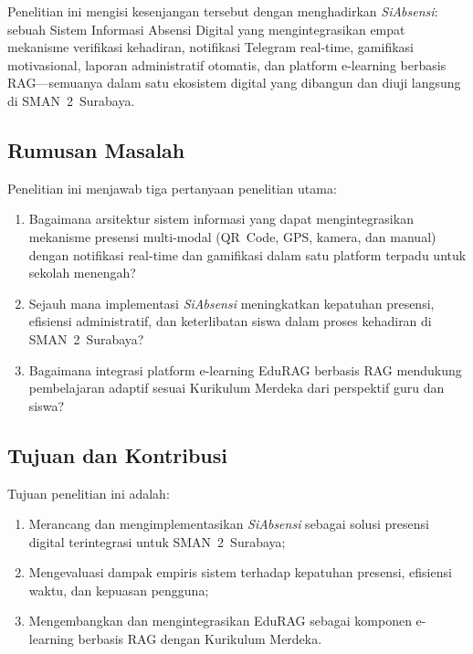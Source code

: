 \documentclass[12pt,a4paper]{article}
\newcommand{\sman}{SMAN~2~Surabaya}
\newcommand{\edurag}{EduRAG}
\newcommand{\sistem}{\textit{SiAbsensi}}
\begin{document}
Penelitian ini mengisi kesenjangan tersebut dengan menghadirkan
\sistem{}: sebuah Sistem Informasi Absensi Digital yang mengintegrasikan
empat mekanisme verifikasi kehadiran, notifikasi Telegram real-time,
gamifikasi motivasional, laporan administratif otomatis, dan platform
e-learning berbasis RAG---semuanya dalam satu ekosistem digital yang
dibangun dan diuji langsung di \sman{}.

\subsection{Rumusan Masalah}

Penelitian ini menjawab tiga pertanyaan penelitian utama:
\begin{enumerate}[label=\textbf{RQ\arabic*.}]
  \item Bagaimana arsitektur sistem informasi yang dapat mengintegrasikan
        mekanisme presensi multi-modal (QR~Code, GPS, kamera, dan manual)
        dengan notifikasi real-time dan gamifikasi dalam satu platform
        terpadu untuk sekolah menengah?
  \item Sejauh mana implementasi \sistem{} meningkatkan kepatuhan presensi,
        efisiensi administratif, dan keterlibatan siswa dalam proses
        kehadiran di \sman{}?
  \item Bagaimana integrasi platform e-learning \edurag{} berbasis RAG
        mendukung pembelajaran adaptif sesuai Kurikulum Merdeka dari
        perspektif guru dan siswa?
\end{enumerate}

\subsection{Tujuan dan Kontribusi}

Tujuan penelitian ini adalah:
\begin{enumerate}
  \item Merancang dan mengimplementasikan \sistem{} sebagai solusi
        presensi digital terintegrasi untuk \sman{};
  \item Mengevaluasi dampak empiris sistem terhadap kepatuhan presensi,
        efisiensi waktu, dan kepuasan pengguna;
  \item Mengembangkan dan mengintegrasikan \edurag{} sebagai komponen
        e-learning berbasis RAG dengan Kurikulum Merdeka.
\end{enumerate}
\end{document}
